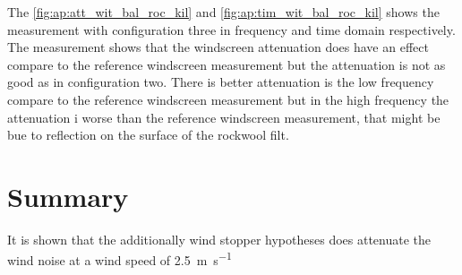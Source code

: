 The \autoref{fig:ap:att_wit_bal_roc_kil} and \autoref{fig:ap:tim_wit_bal_roc_kil} shows the measurement with configuration three in frequency and time domain respectively. The measurement shows that the windscreen attenuation does have an effect compare to the reference windscreen measurement but the attenuation is not as good as in configuration two. There is better attenuation is the low frequency compare to the reference windscreen measurement but in the high frequency the attenuation i worse than the reference windscreen measurement, that might be bue to reflection on the surface of the rockwool filt.


\section*{Summary}
It is shown that the additionally wind stopper hypotheses does attenuate the wind noise at a wind speed of \SI{2.5}{\meter\per\second}
